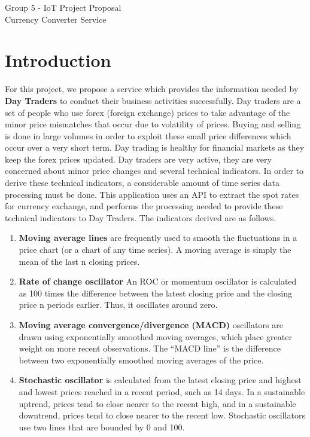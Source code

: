
\begin{center}
\begin{huge}
Group 5 - IoT Project Proposal\\
Currency Converter Service

\end{huge}

\end{center}



\section{Introduction}

For this project, we propose a service which provides the information needed by \textbf{Day Traders} to conduct their business activities successfully. 
Day traders are a set of people who use forex (foreign exchange) prices to take advantage of the minor price mismatches that occur due to volatility of prices. Buying and selling is done in large volumes in order to exploit these small price differences which occur over a very short term. Day trading is healthy for financial markets as they keep the forex prices updated. Day traders are very active, they are very concerned about minor price changes and several technical indicators. 
In order to derive these technical indicators, a considerable amount of time series data processing must be done. This application uses an API to extract the spot rates for currency exchange, and performs the processing needed to provide these technical indicators to Day Traders. The indicators derived are as follows.

\begin{enumerate}
\item \textbf{Moving average lines} are frequently used to smooth the fluctuations in a price chart (or a chart of any time series). A moving average is simply the mean of the last n closing prices. 

\item \textbf{Rate of change oscillator} An ROC or momentum oscillator is calculated as 100 times the difference between the latest closing price and the closing price n periods earlier. Thus, it oscillates around zero.

\item \textbf{Moving average convergence/divergence (MACD)} oscillators are drawn using exponentially smoothed moving averages, which place greater weight on more recent observations. The “MACD line” is the difference between two exponentially smoothed moving averages of the price.

\item \textbf{Stochastic oscillator} is calculated from the latest closing price and highest and lowest prices reached in a recent period, such as 14 days. In a sustainable uptrend, prices tend to close nearer to the recent high, and in a sustainable downtrend, prices tend to close nearer to the recent low. Stochastic oscillators use two lines that are bounded by 0 and 100. 
\end{enumerate}

